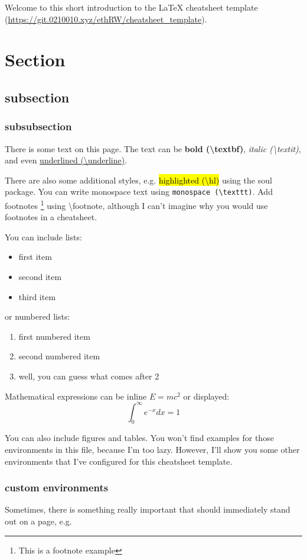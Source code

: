 
Welcome to this short introduction to the LaTeX cheatsheet template (\url{https://git.0210010.xyz/ethRW/cheatsheet_template}).

\section{Section}
\subsection{subsection}
\subsubsection{subsubsection}

There is some text on this page. The text can be \textbf{bold (\textbackslash textbf)}, \textit{italic (\textbackslash textit)}, and even \underline{underlined (\textbackslash underline)}.

There are also some additional styles, e.g. \hl{highlighted (\textbackslash hl)} using the soul package. You can write monospace text using \texttt{monospace (\textbackslash texttt)}. Add footnotes \footnote{This is a footnote example} using \textbackslash footnote, although I can't imagine why you would use footnotes in a cheatsheet.

You can include lists:
\begin{itemize}
    \item first item
    \item second item
    \item third item
\end{itemize}

or numbered lists:
\begin{enumerate}
    \item first numbered item
    \item second numbered item
    \item well, you can guess what comes after 2
\end{enumerate}

Mathematical expressions can be inline $E=mc^2$ or displayed:
$$
\int_0^\infty e^{-x} dx = 1
$$

You can also include figures and tables. You won't find examples for those environments in this file, because I'm too lazy. However, I'll show you some other environments that I've configured for this cheatsheet template.

\subsubsection{custom environments}
Sometimes, there is something really important that should immediately stand out on a page, e.g.

